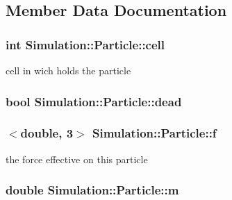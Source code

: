 \subsection{Member Data Documentation}
\hypertarget{classSimulation_1_1Particle_aebbb649086b757029a513e09adf76d4b}{
\subsubsection[{cell}]{\setlength{\rightskip}{0pt plus 5cm}int Simulation\-::\-Particle\-::cell\hspace{0.3cm}{\ttfamily [private]}}}\label{classSimulation_1_1Particle_aebbb649086b757029a513e09adf76d4b}
cell in wich holds the particle \hypertarget{classSimulation_1_1Particle_a5decd76356cb024d1051cf01055ec53f}{
\subsubsection[{dead}]{\setlength{\rightskip}{0pt plus 5cm}bool Simulation\-::\-Particle\-::dead\hspace{0.3cm}{\ttfamily [private]}}}\label{classSimulation_1_1Particle_a5decd76356cb024d1051cf01055ec53f}
\hypertarget{classSimulation_1_1Particle_a54c7b7f1cb33876abdbd505d06c9b499}{
\subsubsection[{f}]{$<$double, 3$>$ Simulation\-::\-Particle\-::f\hspace{0.3cm}{\ttfamily [private]}}}\label{classSimulation_1_1Particle_a54c7b7f1cb33876abdbd505d06c9b499}
the force effective on this particle \hypertarget{classSimulation_1_1Particle_ad2b7f1d70b9aebd312af856c82fae6a8}{
\subsubsection[{m}]{\setlength{\rightskip}{0pt plus 5cm}double Simulation\-::\-Particle\-::m\hspace{0.3cm}{\ttfamily [private]}}}\label{classSimulation_1_1Particle_ad2b7f1d70b9aebd312af856c82fae6a8}
